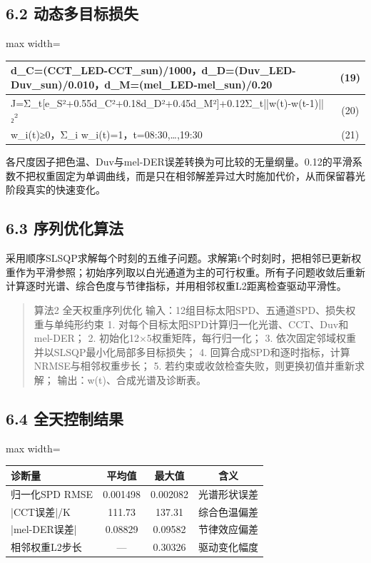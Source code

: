 \documentclass[UTF8,a4paper,12pt]{ctexart}
\begin{document}
\subsection{6.2 动态多目标损失}

\begin{table}[H]
\centering
\small
\begin{adjustbox}{max width=\textwidth}
\begin{tabular}{lc}
\toprule
d\_C=(CCT\_LED-CCT\_sun)/1000，d\_D=(Duv\_LED-Duv\_sun)/0.010，d\_M=(mel\_LED-mel\_sun)/0.20 & (19) \\
\midrule
J=Σ\_t[e\_S²+0.55d\_C²+0.18d\_D²+0.45d\_M²]+0.12Σ\_t||w(t)-w(t-1)||₂² & (20) \\
w\_i(t)≥0，Σ\_i w\_i(t)=1，t=08:30,…,19:30 & (21) \\
\bottomrule
\end{tabular}
\end{adjustbox}
\end{table}

各尺度因子把色温、Duv与mel-DER误差转换为可比较的无量纲量。0.12的平滑系数不把权重固定为单调曲线，而是只在相邻解差异过大时施加代价，从而保留暮光阶段真实的快速变化。

\subsection{6.3 序列优化算法}

采用顺序SLSQP求解每个时刻的五维子问题。求解第t个时刻时，把相邻已更新权重作为平滑参照；初始序列取以白光通道为主的可行权重。所有子问题收敛后重新计算逐时光谱、综合色度与节律指标，并用相邻权重L2距离检查驱动平滑性。

\begin{quote}\small
算法2  全天权重序列优化 输入：12组目标太阳SPD、五通道SPD、损失权重与单纯形约束 1. 对每个目标太阳SPD计算归一化光谱、CCT、Duv和mel-DER； 2. 初始化12×5权重矩阵，每行归一化； 3. 依次固定邻域权重并以SLSQP最小化局部多目标损失； 4. 回算合成SPD和逐时指标，计算NRMSE与相邻权重步长； 5. 若约束或收敛检查失败，则更换初值并重新求解； 输出：w(t)、合成光谱及诊断表。
\end{quote}

\subsection{6.4 全天控制结果}

\begin{table}[H]
\centering
\small
\begin{adjustbox}{max width=\textwidth}
\begin{tabular}{lccc}
\toprule
诊断量 & 平均值 & 最大值 & 含义 \\
\midrule
归一化SPD RMSE & 0.001498 & 0.002082 & 光谱形状误差 \\
|CCT误差|/K & 111.73 & 137.31 & 综合色温偏差 \\
|mel-DER误差| & 0.08829 & 0.09582 & 节律效应偏差 \\
相邻权重L2步长 & — & 0.30326 & 驱动变化幅度 \\
\bottomrule
\end{tabular}
\end{adjustbox}
\end{table}
\end{document}
